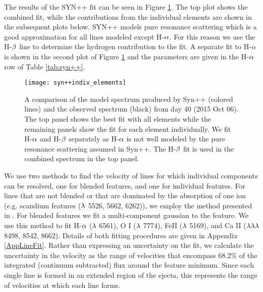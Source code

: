 \documentclass[a4paper,fleqn,usenatbib]{mnras}
\begin{document}
The results of the SYN++ fit can be seen in Figure \ref{fig:syn++}.
The top plot shows the combined fit, while the contributions from the individual elements are shown in the subsequent plots below.
SYN++ models pure resonance scattering which is a good approximation for all lines modeled except H-$\rm{\alpha}$. 
For this reason we use the H-$\rm{\beta}$ line to determine the hydrogen contribution to the fit. 
A separate fit to H-$\rm{\alpha}$ is shown in the second plot of Figure \ref{fig:syn++} and the parameters are given in the H-$\rm{\alpha}$ row of Table \ref{tab:syn++}.
\begin{figure*}
\begin{center}
\texttt{[image: syn++indiv\_elements]} %
\caption{A comparison of the model spectrum produced by Syn++ (colored lines) and the observed spectrum (black) from day 40 (2015 Oct 06).
The top panel shows the best fit with all elements while the remaining panels show the fit for each element individually.
We fit H-$\rm{\alpha}$ and H-$\rm{\beta}$ separately as H-$\rm{\alpha}$ is not well modeled by the pure resonance scattering assumed in Syn++.
The H-$\rm{\beta}$ fit is used in the combined spectrum in the top panel.}
\label{fig:syn++}
\end{center}
\end{figure*}

We use two methods to find the velocity of lines for which individual components can be resolved, one for blended features, and one for individual features.
For lines that are not blended or that are dominated by the absorption of one ion (e.g. scandium features ($\rm{\lambda}$ 5526, 5662, 6262)), we employ the method presented in \citet{2012silverman}. 
For blended features we fit a multi-component gaussian to the feature.
We use this method to fit H-$\rm{\alpha}$ ($\rm{\lambda}$ 6561), O I ($\rm{\lambda}$ 7774), FeII ($\rm{\lambda}$ 5169), and Ca II ($\rm{\lambda\lambda\lambda}$ 8498, 8542, 8662). 
Details of both fitting procedures are given in Appendix \ref{AppLineFit}.
Rather than expressing an uncertainty on the fit, we calculate the uncertainty in the velocity as the range of velocities that encompass 68.2\% of the integrated (continuum subtracted) flux around the feature minimum.
Since each single line is formed in an extended region of the ejecta, this represents the range of velocities at which each line forms.
\end{document}

